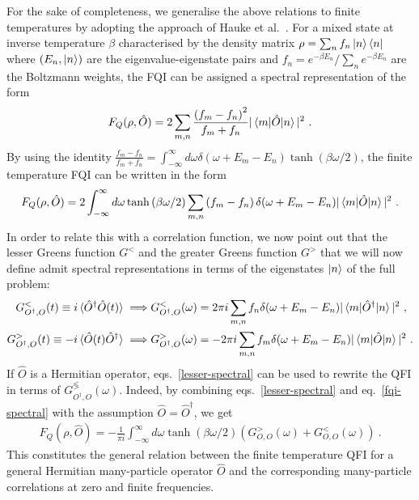 For the sake of completeness, we generalise the above relations to finite temperatures by adopting the approach of Hauke et al.~\cite{Hauke2016}. For a mixed state at inverse temperature \(\beta\) characterised by the density matrix \(\rho = \sum_n f_n \ket{n}\bra{n}\) where \(\left(E_n,\ket{n}\right)\) are the eigenvalue-eigenstate pairs and \(f_n = e^{-\beta E_n}/\sum_n e^{-\beta E_n}\) are the Boltzmann weights, the FQI can be assigned a spectral representation of the form~\cite{Hauke2016}
\begin{eqnarray}
	F_Q(\rho, \hat O) = 2\sum_{m,n} \frac{\left(f_m - f_n\right)^2}{f_m + f_n}|\braket{m|\hat O|n}|^2~.
\end{eqnarray}
By using the identity \(\frac{f_m - f_n}{f_m + f_n} = \int_{-\infty}^\infty d\omega \delta(\omega + E_m - E_n)\tanh \left( \beta \omega/2 \right) \), the finite temperature FQI can be written in the form
\begin{eqnarray}\label{fqi-spectral}
	F_Q(\rho, \hat O) = 2\int_{-\infty}^\infty d\omega \tanh \left( \beta \omega/2 \right) \sum_{m,n} \left(f_m - f_n\right) \delta(\omega + E_m - E_n)|\braket{m|\hat O|n}|^2~.
\end{eqnarray}
In order to relate this with a correlation function, we now point out that the lesser Greens function \(G^<\) and the greater Greens function \(G^>\) that we will now define admit spectral representations in terms of the eigenstates \(\ket{n}\) of the full problem:
\begin{eqnarray}\label{lesser-spectral}
	G^<_{O^\dagger, O}(t) \equiv i\braket{\hat O^\dagger \hat O(t)} \implies & G^<_{O^\dagger, O}(\omega) = 2\pi i \sum_{m,n}f_n \delta(\omega + E_m - E_n) |\braket{m|\hat O^\dagger|n}|^2~,\\
	G^>_{O^\dagger, O}(t) \equiv -i\braket{\hat O(t) \hat O^\dagger} \implies & G^>_{O^\dagger, O}(\omega) = -2\pi i \sum_{m,n}f_m \delta(\omega + E_m - E_n) |\braket{m|\hat O|n}|^2~.
\end{eqnarray}
If \(\hat O\) is a Hermitian operator, eqs.~\eqref{lesser-spectral} can be used to rewrite the QFI in terms of \(G^\lessgtr_{O^\dagger, O}(\omega)\). Indeed, by combining eqs.~\eqref{lesser-spectral} and eq.~\eqref{fqi-spectral} with the assumption \(\hat O = \hat O^\dagger\), we get
\begin{eqnarray}
	F_Q(\rho, \hat O) = -\frac{1}{\pi i}\int_{-\infty}^\infty d\omega \tanh \left( \beta \omega/2 \right)\left(G^>_{O, O}(\omega) + G^<_{O, O}(\omega)\right)~. 
\end{eqnarray}
This constitutes the general relation between the finite temperature QFI for a general Hermitian many-particle operator \(\hat O\) and the corresponding many-particle correlations at zero and finite frequencies.

